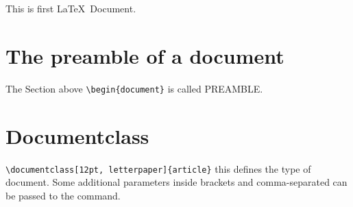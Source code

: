 \documentclass{article}
\begin{document}
This is first \LaTeX\ Document. 
\section{The preamble of a document} 
The Section above \verb|\begin{document}| is called PREAMBLE.

\section{Documentclass}
\verb|\documentclass[12pt, letterpaper]{article}|
this defines the type of document. Some additional parameters inside brackets and comma-separated can be passed to the command.
\end{document}
